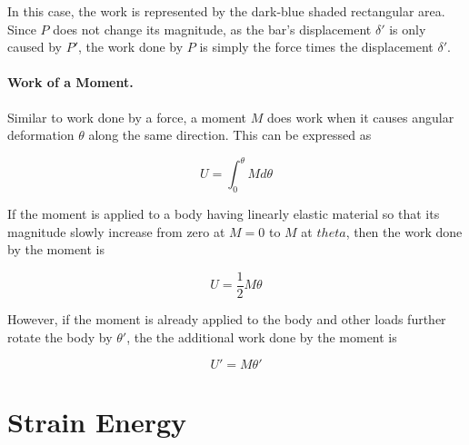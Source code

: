 \documentclass[
10pt,
a4paper,
openany,
svgnames,
]{book} %
\begin{document}
In this case, the work is represented by the dark-blue shaded rectangular area. Since $P$ does not change its magnitude, as the bar's displacement $\delta'$ is only caused by $P'$, the work done by $P$ is simply the force times the displacement $\delta'$.

\paragraph{Work of a Moment.}

Similar to work done by a force, a moment $M$ does work when it causes angular deformation $\theta$ along the same direction. This can be expressed as

\begin{figure}[h]
  \centering
\end{figure}

  \begin{equation}
  U = \int_0^\theta M d\theta
\end{equation}

If the moment is applied to a body having linearly elastic material so that its magnitude slowly increase from zero at $M = 0$ to $M$ at $theta$, then the work done by the moment is

\begin{equation}
  U = \frac{1}{2} M \theta
\end{equation}

However, if the moment is already applied to the body and other loads further rotate the body by $\theta'$, the the additional work done by the moment is

\begin{equation}
  U' = M \theta'
\end{equation}

\section{Strain Energy}
\end{document}
